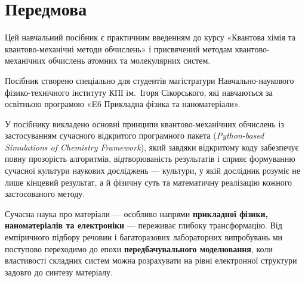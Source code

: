 \chapter*{Передмова}


Цей навчальний посібник є практичним введенням до курсу «Квантова хімія та квантово-механічні методи обчислень» і присвячений методам квантово-механічних обчислень атомних та молекулярних систем.

Посібник створено спеціально для студентів магістратури Навчально-наукового фізико-технічного інституту КПІ ім.~Ігоря Сікорського, які навчаються за освітньою програмою «E6 Прикладна фізика та наноматеріали».

У посібнику викладено основні принципи квантово-механічних обчислень із застосуванням сучасного відкритого програмного пакета \href{https://pyscf.org/}{\PySCF} (\emph{Python-based Simulations of Chemistry Framework}), який завдяки відкритому коду забезпечує повну прозорість алгоритмів, відтворюваність результатів і сприяє формуванню сучасної культури наукових досліджень --- культури, у якій дослідник розуміє не лише кінцевий результат, а й фізичну суть та математичну реалізацію кожного застосованого методу.




Сучасна наука про матеріали --- особливо напрями \textbf{прикладної фізики, наноматеріалів та електроніки} --- переживає глибоку трансформацію. Від емпіричного підбору речовин і багаторазових лабораторних випробувань ми поступово переходимо до епохи \textbf{передбачувального моделювання}, коли властивості складних систем можна розрахувати на рівні електронної структури задовго до синтезу матеріалу.

